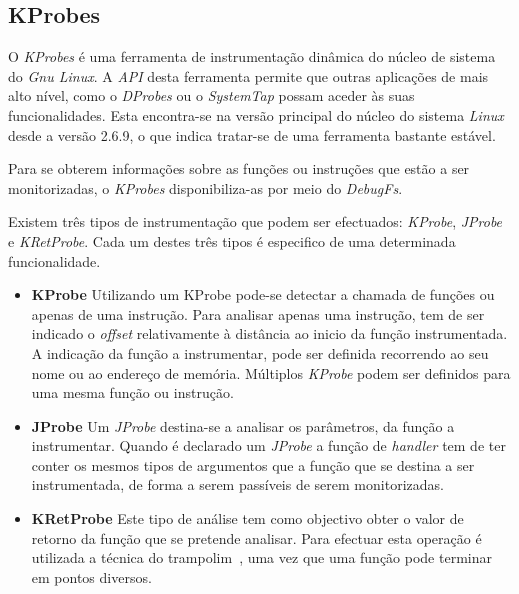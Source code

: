 \subsection{KProbes}\label{sect:KProbes_overview}

O \textit{KProbes} é uma ferramenta de instrumentação dinâmica do núcleo de sistema do \textit{Gnu Linux}.
A \textit{API} desta ferramenta permite que outras aplicações de mais alto nível, como o \textit{DProbes} ou o \textit{SystemTap} possam aceder às suas funcionalidades.
Esta encontra-se na versão principal do núcleo do sistema \textit{Linux} desde a versão 2.6.9, o que indica tratar-se de uma ferramenta bastante estável\cite{kernel_debug_printk_on_fly,KProbesSite}.


Para se obterem informações sobre as funções ou instruções que estão a ser monitorizadas, o \textit{KProbes} disponibiliza-as por meio do \textit{DebugFs}.

Existem três tipos de instrumentação que podem ser efectuados: \textit{KProbe}, \textit{JProbe} e \textit{KRetProbe}.
Cada um destes três tipos é especifico de uma determinada funcionalidade.

\begin{itemize}
 \item \textbf{KProbe}
Utilizando um KProbe pode-se detectar a chamada de funções ou apenas de uma instrução.
Para analisar apenas uma instrução, tem de ser indicado o \textit{offset} relativamente à distância ao inicio da função instrumentada.
A indicação da função a instrumentar, pode ser definida recorrendo ao seu nome ou ao endereço de memória.
Múltiplos \textit{KProbe} podem ser definidos para uma mesma função ou instrução.

\item \textbf{JProbe}
Um \textit{JProbe} destina-se a analisar os parâmetros, da função a instrumentar.
Quando é declarado um \textit{JProbe} a função de \textit{handler} tem de ter conter os mesmos tipos de argumentos que a função que se destina a ser instrumentada, de forma a serem passíveis de serem monitorizadas.
 

 \item \textbf{KRetProbe}
Este tipo de análise tem como objectivo obter o valor de retorno da função que se pretende analisar.
Para efectuar esta operação é utilizada a técnica do trampolim~\cite{Hollingsworth94dynamicprogram}, uma vez que uma função pode terminar em pontos diversos.


\end{itemize}

